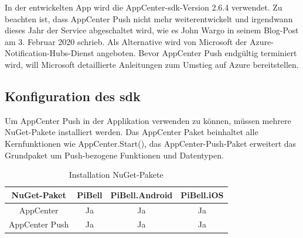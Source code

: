 In der entwickelten App wird die AppCenter-\acs{sdk}-Version 2.6.4 verwendet. Zu beachten ist, dass AppCenter Push nicht mehr weiterentwickelt und irgendwann dieses Jahr der Service abgeschaltet wird, wie es John Wargo in seinem Blog-Post am 3. Februar 2020 schrieb. Als Alternative wird von Microsoft der Azure-Notification-Hubs-Dienst angeboten. Bevor AppCenter Push endgültig terminiert wird, will Microsoft detaillierte Anleitungen zum Umstieg auf Azure bereitstellen.\par

\subsection{Konfiguration des \acs{sdk}}
Um AppCenter Push in der Applikation verwenden zu können, müssen mehrere NuGet-Pakete installiert werden.
Das AppCenter Paket beinhaltet alle Kernfunktionen wie AppCenter.Start(), das AppCenter-Push-Paket erweitert das Grundpaket um Push-bezogene Funktionen und Datentypen.
\begin{table}[H]
    \centering\begin{tabular}{|c|c|c|c|}
        \hline
        NuGet-Paket & PiBell & PiBell.Android & PiBell.iOS\\
        \hline
        AppCenter & Ja & Ja & Ja\\
        AppCenter Push & Ja & Ja & Ja\\
        \hline    
    \end{tabular}
    \caption{Installation NuGet-Pakete}
\end{table}